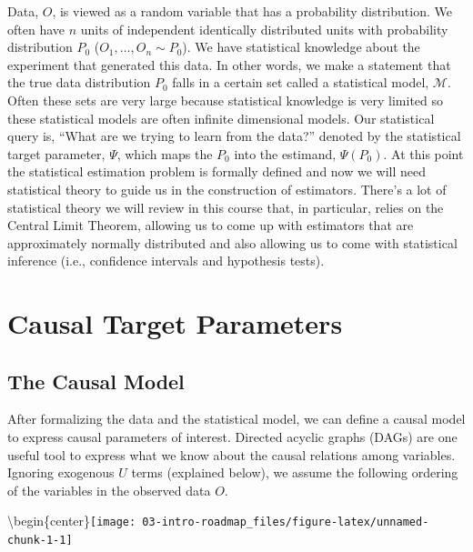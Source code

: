 \documentclass[
  12pt, krantz2,
]{book}
\theoremstyle{definition}
\theoremstyle{definition}
\theoremstyle{definition}
\newcommand{\1}{\mathbbm{1}}
\begin{document}
Data, \(O\), is viewed as a random variable that has a probability distribution.
We often have \(n\) units of independent identically distributed units with
probability distribution \(P_0\) (\(O_1, \ldots, O_n \sim P_0\)). We have
statistical knowledge about the experiment that generated this data. In other
words, we make a statement that the true data distribution \(P_0\) falls in a
certain set called a statistical model, \(\mathcal{M}\). Often these sets are very
large because statistical knowledge is very limited so these statistical models
are often infinite dimensional models. Our statistical query is, ``What are we
trying to learn from the data?'' denoted by the statistical target parameter,
\(\Psi\), which maps the \(P_0\) into the estimand, \(\Psi(P_0)\). At this point the
statistical estimation problem is formally defined and now we will need
statistical theory to guide us in the construction of estimators. There's a lot
of statistical theory we will review in this course that, in particular, relies
on the Central Limit Theorem, allowing us to come up with estimators that are
approximately normally distributed and also allowing us to come with statistical
inference (i.e., confidence intervals and hypothesis tests).

\hypertarget{causal}{%
\section{Causal Target Parameters}\label{causal}}

\hypertarget{the-causal-model}{%
\subsection{The Causal Model}\label{the-causal-model}}

After formalizing the data and the statistical model, we can define a causal
model to express causal parameters of interest. Directed acyclic graphs (DAGs)
are one useful tool to express what we know about the causal relations among
variables. Ignoring exogenous \(U\) terms (explained below), we assume the
following ordering of the variables in the observed data \(O\).

\textbackslash begin\{center\}\texttt{[image: 03-intro-roadmap\_files/figure-latex/unnamed-chunk-1-1]}
\end{document}
